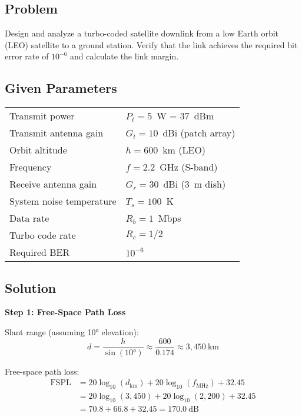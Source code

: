 \subsection*{Problem}

Design and analyze a turbo-coded satellite downlink from a low Earth orbit (LEO) satellite to a ground station. Verify that the link achieves the required bit error rate of $10^{-6}$ and calculate the link margin.

\subsection*{Given Parameters}

\begin{tabular}{@{}ll@{}}
Transmit power & $P_t = 5$~W = 37~dBm \\
Transmit antenna gain & $G_t = 10$~dBi (patch array) \\
Orbit altitude & $h = 600$~km (LEO) \\
Frequency & $f = 2.2$~GHz (S-band) \\
Receive antenna gain & $G_r = 30$~dBi (3~m dish) \\
System noise temperature & $T_s = 100$~K \\
Data rate & $R_b = 1$~Mbps \\
Turbo code rate & $R_c = 1/2$ \\
Required BER & $10^{-6}$ \\
\end{tabular}

\subsection*{Solution}

\textbf{Step 1: Free-Space Path Loss}

Slant range (assuming 10° elevation):
\begin{equation}
d = \frac{h}{\sin(10°)} \approx \frac{600}{0.174} \approx 3{,}450~\text{km}
\end{equation}

Free-space path loss:
\begin{equation}
\begin{aligned}
\text{FSPL} &= 20\log_{10}(d_{\text{km}}) + 20\log_{10}(f_{\text{MHz}}) + 32.45 \\
&= 20\log_{10}(3{,}450) + 20\log_{10}(2{,}200) + 32.45 \\
&= 70.8 + 66.8 + 32.45 = 170.0~\text{dB}
\end{aligned}
\end{equation}

